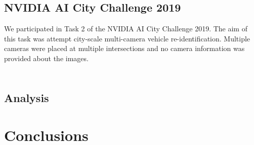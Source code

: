 \documentclass[10pt,twocolumn,letterpaper]{article}
\begin{document}
\subsection{NVIDIA AI City Challenge 2019}

We participated in Task 2 of the NVIDIA AI City Challenge 2019. The aim of this task was attempt city-scale multi-camera vehicle re-identification. Multiple cameras were placed at multiple intersections and no camera information was provided about the images.

\begin{table}
  \centering
  \begin{tabular}{l || c | c}

  \end{tabular}
  \caption{}
  \label{T:aicity_results}
\end{table}

\subsection{Analysis}

\section{Conclusions}

{\small


}
\end{document}
